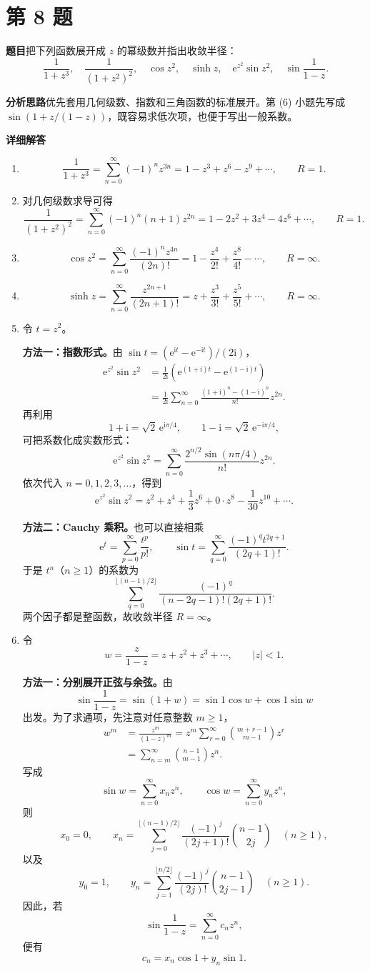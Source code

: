 \documentclass[UTF8,11pt,a4paper,fontset=fandol]{ctexart}
\newcommand{\ii}{\mathrm{i}}
\newcommand{\ee}{\mathrm{e}}
\newcommand{\idea}{\par\medskip\Needspace{3\baselineskip}\noindent\textbf{分析思路}\quad}
\newcommand{\answer}{\par\medskip\Needspace{3\baselineskip}\noindent\textbf{详细解答}\quad}
\newcommand{\problem}[1]{\par\Needspace{8\baselineskip}\section*{第 #1 题}\addcontentsline{toc}{section}{第 #1 题}}
\begin{document}
\problem{8}
\textbf{题目}\quad 把下列函数展开成 $z$ 的幂级数并指出收敛半径：
\[
\frac1{1+z^3},\quad \frac1{(1+z^2)^2},\quad \cos z^2,\quad
\sinh z,\quad \ee^{z^2}\sin z^2,\quad \sin\frac1{1-z}.
\]
\idea 优先套用几何级数、指数和三角函数的标准展开。第 (6) 小题先写成 $\sin(1+z/(1-z))$，既容易求低次项，也便于写出一般系数。
\answer
\begin{enumerate}
\item
\[
\frac1{1+z^3}=\sum_{n=0}^{\infty}(-1)^nz^{3n}
=1-z^3+z^6-z^9+\cdots,
\qquad R=1.
\]
\item 对几何级数求导可得
\[
\frac1{(1+z^2)^2}=\sum_{n=0}^{\infty}(-1)^n(n+1)z^{2n}
=1-2z^2+3z^4-4z^6+\cdots,
\qquad R=1.
\]
\item
\[
\cos z^2=\sum_{n=0}^{\infty}\frac{(-1)^n z^{4n}}{(2n)!}
=1-\frac{z^4}{2!}+\frac{z^8}{4!}-\cdots,
\qquad R=\infty.
\]
\item
\[
\sinh z=\sum_{n=0}^{\infty}\frac{z^{2n+1}}{(2n+1)!}
=z+\frac{z^3}{3!}+\frac{z^5}{5!}+\cdots,
\qquad R=\infty.
\]
\item 令 $t=z^2$。

\textbf{方法一：指数形式。}由 $\sin t=(\ee^{\ii t}-\ee^{-\ii t})/(2\ii)$，
\begin{align*}
\ee^{z^2}\sin z^2
&=\frac1{2\ii}\left(\ee^{(1+\ii)t}-\ee^{(1-\ii)t}\right)\\
&=\frac1{2\ii}\sum_{n=0}^{\infty}
\frac{(1+\ii)^n-(1-\ii)^n}{n!}z^{2n}.
\end{align*}
再利用
\[
1+\ii=\sqrt2\,\ee^{\ii\pi/4},\qquad
1-\ii=\sqrt2\,\ee^{-\ii\pi/4},
\]
可把系数化成实数形式：
\[
\ee^{z^2}\sin z^2
=\sum_{n=0}^{\infty}
\frac{2^{n/2}\sin(n\pi/4)}{n!}z^{2n}.
\]
依次代入 $n=0,1,2,3,\ldots$，得到
\[
\ee^{z^2}\sin z^2
=z^2+z^4+\frac13z^6+0\cdot z^8-\frac1{30}z^{10}+\cdots.
\]

\textbf{方法二：Cauchy 乘积。}也可以直接相乘
\[
\ee^t=\sum_{p=0}^{\infty}\frac{t^p}{p!},\qquad
\sin t=\sum_{q=0}^{\infty}\frac{(-1)^qt^{2q+1}}{(2q+1)!}.
\]
于是 $t^n$（$n\ge1$）的系数为
\[
\sum_{q=0}^{\lfloor(n-1)/2\rfloor}
\frac{(-1)^q}{(n-2q-1)!(2q+1)!}.
\]
两个因子都是整函数，故收敛半径 $R=\infty$。

\item 令
\[
w=\frac{z}{1-z}=z+z^2+z^3+\cdots,\qquad |z|<1.
\]

\textbf{方法一：分别展开正弦与余弦。}由
\[
\sin\frac1{1-z}=\sin(1+w)=\sin1\cos w+\cos1\sin w
\]
出发。为了求通项，先注意对任意整数 $m\ge1$，
\begin{align*}
w^m
&=\frac{z^m}{(1-z)^m}
=z^m\sum_{r=0}^{\infty}\binom{m+r-1}{m-1}z^r\\
&=\sum_{n=m}^{\infty}\binom{n-1}{m-1}z^n.
\end{align*}
写成
\[
\sin w=\sum_{n=0}^{\infty}x_nz^n,\qquad
\cos w=\sum_{n=0}^{\infty}y_nz^n,
\]
则
\[
x_0=0,\qquad
x_n=\sum_{j=0}^{\lfloor(n-1)/2\rfloor}
\frac{(-1)^j}{(2j+1)!}\binom{n-1}{2j}\quad(n\ge1),
\]
以及
\[
y_0=1,\qquad
y_n=\sum_{j=1}^{\lfloor n/2\rfloor}
\frac{(-1)^j}{(2j)!}\binom{n-1}{2j-1}\quad(n\ge1).
\]
因此，若
\[
\sin\frac1{1-z}=\sum_{n=0}^{\infty}c_nz^n,
\]
便有
\[
c_n=x_n\cos1+y_n\sin1.
\]


\end{enumerate}
\end{document}
